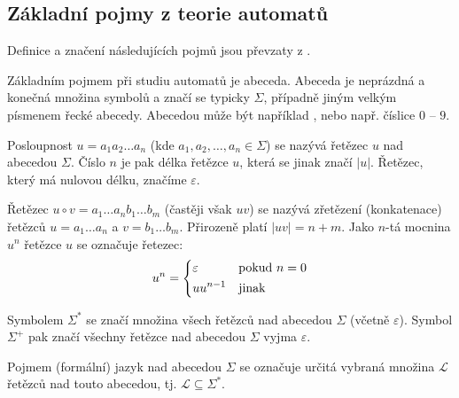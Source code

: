 \subsection{Základní pojmy z teorie automatů}
Definice a značení následujících pojmů jsou převzaty z \cite{Koz-AutComp}.

Základním pojmem při studiu automatů je abeceda. Abeceda je neprázdná a konečná množina symbolů a značí se typicky $\Sigma$, případně jiným velkým písmenem řecké abecedy. Abecedou může být například , nebo např. číslice $0$ -- $9$.

Posloupnost $u = a_1 a_2 \dots a_n$ (kde $a_1,  a_2, \dots, a_n \in \Sigma$) se nazývá řetězec $u$ nad abecedou $\Sigma$. Číslo $n$ je pak délka řetězce $u$, která se jinak značí $|u|$. Řetězec, který má nulovou délku, značíme $\varepsilon$.

Řetězec $u \circ v = a_1 \dots a_n b_1 \dots b_m$ (častěji však $uv$) se nazývá zřetězení (konkatenace) řetězců $u = a_1 \dots a_n$ a $v = b_1 \dots b_m$. Přirozeně platí $|uv| = n + m$. Jako $n$-tá mocnina $u^n$ řetězce $u$ se označuje řetezec:
$$
  u^n = \begin{dcases}
    \varepsilon & \text{pokud } n = 0\\
    u u^{n-1} & \text{jinak}
  \end{dcases}
$$

Symbolem $\Sigma^*$ se značí množina všech řetězců nad abecedou $\Sigma$ (včetně $\varepsilon$). Symbol $\Sigma^+$ pak značí všechny řetězce nad abecedou $\Sigma$ vyjma $\varepsilon$. 

Pojmem (formální) jazyk nad abecedou $\Sigma$ se označuje určitá vybraná množina $\mathcal{L}$ řetězců nad touto abecedou, tj. $\mathcal{L} \subseteq \Sigma^*$.

%   

